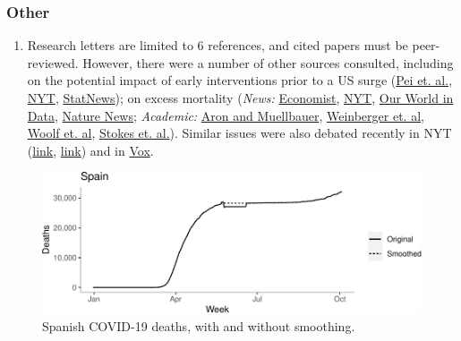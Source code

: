 \documentclass[
]{article}
\providecommand{\tightlist}{%
  \setlength{\itemsep}{0pt}\setlength{\parskip}{0pt}}
\begin{document}
\bigskip

\hypertarget{other}{%
\subsubsection{Other}\label{other}}

\begin{enumerate}
\def\labelenumi{\arabic{enumi}.}
\tightlist
\item
  Research letters are limited to 6 references, and cited papers must be
  peer-reviewed. However, there were a number of other sources
  consulted, including on the potential impact of early interventions
  prior to a US surge
  (\href{https://www.medrxiv.org/content/10.1101/2020.05.15.20103655v2}{Pei et. al.},
  \href{https://www.nytimes.com/2020/04/14/opinion/covid-social-distancing.html?searchResultPosition=2}{NYT},
  \href{https://www.statnews.com/2020/06/19/faster-response-prevented-most-us-covid-19-deaths/}{StatNews});
  on excess mortality (\emph{News:}
  \href{https://www.economist.com/graphic-detail/2020/07/15/tracking-covid-19-excess-deaths-across-countries}{Economist},
  \href{https://www.nytimes.com/interactive/2020/04/21/world/coronavirus-missing-deaths.html}{NYT},
  \href{https://ourworldindata.org/excess-mortality-covid}{Our World in Data},
  \href{https://www.nature.com/articles/d41586-020-02497-w}{Nature News};
  \emph{Academic:}
  \href{https://www.inet.ox.ac.uk/files/15.44-final-25-Aug-20-Aron-Muellbauer-Transatlantic-excess-mortality-comparison-r.pdf}{Aron and Muellbauer},
  \href{https://jamanetwork.com/journals/jamainternalmedicine/fullarticle/2767980}{Weinberger et. al},
  \href{https://jamanetwork.com/journals/jama/fullarticle/2768086}{Woolf et. al},
  \href{https://www.medrxiv.org/content/10.1101/2020.08.31.20184036v3}{Stokes et. al.}).
  Similar issues were also debated recently in NYT
  (\href{https://www.nytimes.com/2020/09/01/briefing/coronavirus-kenosha-massachusetts-your-tuesday-briefing.html}{link},
  \href{https://www.nytimes.com/2020/09/05/opinion/sunday/covid-19-trump.html}{link})
  and in
  \href{https://www.vox.com/future-perfect/2020/9/9/21428769/covid-19-coronavirus-deaths-statistics-us-canada-europe}{Vox}.
\end{enumerate}

\bigskip

\clearpage

\begin{figure}
\centering
\includegraphics{extended_supplement_FINAL_files/figure-latex/notes2-1.pdf}
\caption{\label{supp.fig.spain} Spanish COVID-19 deaths, with and
without smoothing.}
\end{figure}
\end{document}
